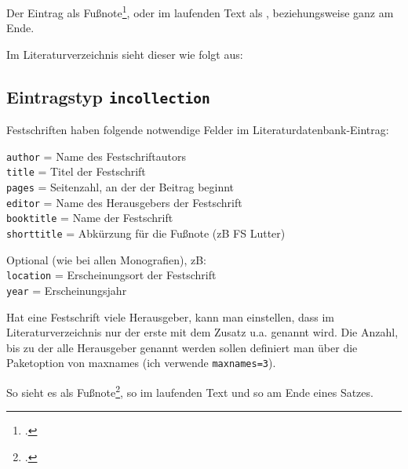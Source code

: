 Der Eintrag als Fußnote\footcite[Schneider][§~4 Rn.~443]{Gans2002}, oder im laufenden
Text als \cite[Schneider][§~4 Rn.~443]{Gans2002}, beziehungsweise ganz am Ende.~\parencite[Schneider][§~4 Rn.~443]{Gans2002}


Im Literaturverzeichnis sieht dieser wie folgt aus:

{}


\subsection{Eintragstyp \texttt{incollection}}


Festschriften haben folgende notwendige Felder im Literaturdatenbank-Eintrag:

\texttt{author} = Name des Festschriftautors\\
\texttt{title} = Titel der Festschrift\\
\texttt{pages} = Seitenzahl, an der der Beitrag beginnt\\
\texttt{editor} = Name des Herausgebers der Festschrift\\
\texttt{booktitle} = Name der Festschrift\\
\texttt{shorttitle} = Abkürzung für die Fußnote (zB FS Lutter)

Optional (wie bei allen Monografien), zB:\\
\texttt{location} = Erscheinungsort der Festschrift\\
\texttt{year} = Erscheinungsjahr

Hat eine Festschrift viele Herausgeber, kann man einstellen, dass im Literaturverzeichnis nur der 
erste mit dem Zusatz u.a. genannt wird. Die Anzahl, bis zu der alle Herausgeber genannt werden 
sollen definiert man über die Paketoption von \bib maxnames (ich verwende \texttt{maxnames=3}).

So sieht es als Fußnote\footcite{Schwaiger2004}, so im laufenden Text \cite{Schwaiger2004} und
so am Ende eines Satzes.~\parencite{Schwaiger2004}

